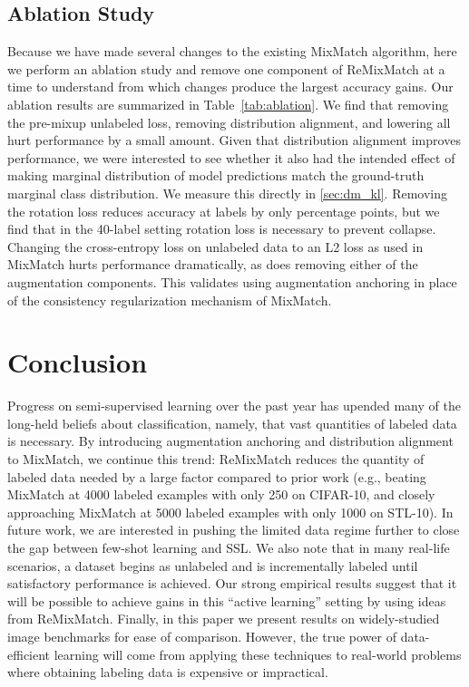\documentclass{article} \usepackage{iclr2020_conference,times}
\begin{document}
\subsection{Ablation Study}

Because we have made several changes to the existing MixMatch algorithm,
here we perform an ablation study and remove one component of ReMixMatch
at a time to understand from which changes produce the largest accuracy gains.
Our ablation results are summarized in Table~\ref{tab:ablation}.
We find that removing the pre-mixup unlabeled loss, removing distribution alignment, and lowering  all hurt performance by a small amount.
Given that distribution alignment improves performance, we were interested to see whether it also had the intended effect of making marginal distribution of model predictions match the ground-truth marginal class distribution.
We measure this directly in \cref{sec:dm_kl}.
Removing the rotation loss reduces accuracy at  labels by only  percentage points, but we find that in the 40-label setting rotation loss is necessary to prevent collapse.
Changing the cross-entropy loss on unlabeled data to an L2 loss as used in MixMatch hurts performance dramatically, as does removing either of the augmentation components.
This validates using augmentation anchoring in place of the consistency regularization mechanism of MixMatch.

\section{Conclusion}

Progress on semi-supervised learning over the past year has upended many of the
long-held beliefs about classification, namely, that vast quantities of
labeled data is necessary.
By introducing augmentation anchoring and distribution alignment to MixMatch, we continue this trend:
ReMixMatch reduces the quantity of labeled data needed by a large factor compared to prior work  
(e.g., beating MixMatch at 4000 labeled
examples with only 250 on CIFAR-10, and closely approaching MixMatch at 5000 labeled examples
with only 1000 on STL-10).
In future work, we are interested in pushing the limited data regime further to close the gap between few-shot learning and SSL.
We also note that in many real-life scenarios, a dataset begins as unlabeled and is incrementally labeled until satisfactory performance is achieved.
Our strong empirical results suggest that it will be possible to achieve gains in this ``active learning'' setting by using ideas from ReMixMatch.
Finally, in this paper we present results on widely-studied image benchmarks for ease of comparison.
However, the true power of data-efficient learning will come from applying these techniques to real-world problems where obtaining labeling data is expensive or impractical.
\end{document}
